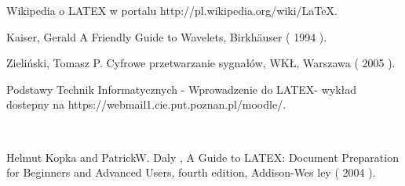 \documentclass[a4paper,11pt]{article}
\begin{document}
\begin{thebibliography}{99}

 Wikipedia o LATEX w portalu http://pl.wikipedia.org/wiki/LaTeX.




  Kaiser, Gerald A Friendly Guide to Wavelets, Birkhäuser ( 1994 ).

 Zieliński, Tomasz P. Cyfrowe przetwarzanie sygnałów, WKŁ, Warszawa (
2005 ).






 Podstawy Technik Informatycznych - Wprowadzenie do LATEX- wykład dostepny
na https://webmail1.cie.put.poznan.pl/moodle/.


\begin{figure}
 \centering
	\qquad
	\\
\end{figure}




 Helmut Kopka and PatrickW. Daly , A Guide to LATEX: Document Preparation
for Beginners and Advanced Users, fourth edition, Addison-Wes ley
( 2004 ).


\end{thebibliography}
\end{document}
